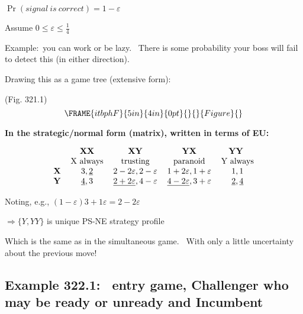 \documentclass{article}
\begin{document}
$\Pr (signal~is~correct)=1-\varepsilon $

Assume $0\leq \varepsilon \leq \frac{1}{4}$

\bigskip

Example:\ you can work or be lazy. \ There is some probability your boss
will fail to detect this (in either direction). \ 

\bigskip

Drawing this as a game tree (extensive form):

\bigskip (Fig. 321.1)%
\begin{equation}
\FRAME{itbphF}{5in}{4in}{0pt}{}{}{Figure}{\special{language "Scientific
Word";type "GRAPHIC";maintain-aspect-ratio TRUE;display "USEDEF";valid_file
"T";width 5in;height 4in;depth 0pt;original-width 5.5201in;original-height
3.7758in;cropleft "0";croptop "1";cropright "1";cropbottom "0";tempfilename
'JSH1WT05.wmf';tempfile-properties "XPR";}}
\end{equation}

\textbf{In the strategic/normal form (matrix), written in terms of EU:}

\[
\begin{tabular}{ccccc}
& \textbf{XX} & \textbf{XY} & \textbf{YX} & \textbf{YY } \\ 
& X always & trusting & paranoid & Y always \\ 
\textbf{X} & $3,\underline{2}$ & $2-2\varepsilon ,2-\varepsilon $ & $%
1+2\varepsilon ,1+\varepsilon $ & $1,1$ \\ 
\textbf{Y} & $\underline{4},3$ & \underline{$2+2\varepsilon $}$%
,4-\varepsilon $ & \underline{$4-2\varepsilon $}$,3+\varepsilon $ & $%
\underline{2},\underline{4}$%
\end{tabular}%
\]

Noting, e.g., $(1-\varepsilon )3+1\varepsilon =2-2\varepsilon $

\bigskip

$\mathbf{\Longrightarrow \{}Y,YY\}$ is unique PS-NE strategy profile

\bigskip

Which is the same as in the simultaneous game. \ With only a little
uncertainty about the previous move!

\bigskip

\bigskip

\subsection{Example 322.1: \ entry game, Challenger who may be ready or
unready and Incumbent}
\end{document}
